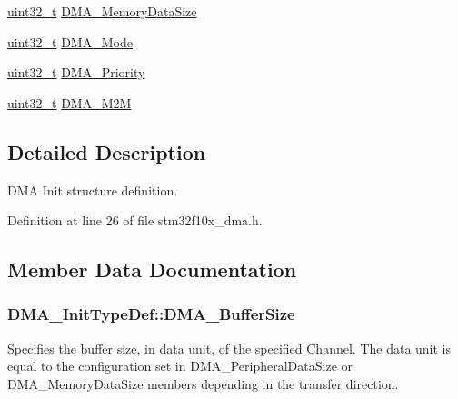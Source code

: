 \begin{DoxyCompactItemize}
\hyperlink{_p_e___types_8h_a33594304e786b158f3fb30289278f5af}{uint32\+\_\+t} \hyperlink{struct_d_m_a___init_type_def_a74bb71921c4d198d6cf1979c120f694f}{D\+M\+A\+\_\+\+Memory\+Data\+Size}
\item 
\hyperlink{_p_e___types_8h_a33594304e786b158f3fb30289278f5af}{uint32\+\_\+t} \hyperlink{struct_d_m_a___init_type_def_a8adbe6f3e46471d109afaa3111dce220}{D\+M\+A\+\_\+\+Mode}
\item 
\hyperlink{_p_e___types_8h_a33594304e786b158f3fb30289278f5af}{uint32\+\_\+t} \hyperlink{struct_d_m_a___init_type_def_ab9a17bd51778478cbd728c868206dca0}{D\+M\+A\+\_\+\+Priority}
\item 
\hyperlink{_p_e___types_8h_a33594304e786b158f3fb30289278f5af}{uint32\+\_\+t} \hyperlink{struct_d_m_a___init_type_def_a57944cc447e6fcde4e9aa6229d3b4c5d}{D\+M\+A\+\_\+\+M2M}
\end{DoxyCompactItemize}


\subsection{Detailed Description}
D\+MA Init structure definition. 

Definition at line 26 of file stm32f10x\+\_\+dma.\+h.



\subsection{Member Data Documentation}
\subsubsection[{\texorpdfstring{D\+M\+A\+\_\+\+Buffer\+Size}{DMA_BufferSize}}]{ D\+M\+A\+\_\+\+Init\+Type\+Def\+::\+D\+M\+A\+\_\+\+Buffer\+Size}\hypertarget{struct_d_m_a___init_type_def_ad402531bd12f654106223c2c113d678c}{}\label{struct_d_m_a___init_type_def_ad402531bd12f654106223c2c113d678c}
Specifies the buffer size, in data unit, of the specified Channel. The data unit is equal to the configuration set in D\+M\+A\+\_\+\+Peripheral\+Data\+Size or D\+M\+A\+\_\+\+Memory\+Data\+Size members depending in the transfer direction. 

